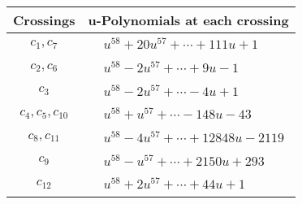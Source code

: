 \documentclass[1p]{elsarticle_modified}
\theoremstyle{definition}
\begin{document}
\begin{tabular}{m{50pt}|m{274pt}}
Crossings & \hspace{64pt}u-Polynomials at each crossing \\
\hline $$\begin{aligned}c_{1},c_{7}\end{aligned}$$&$\begin{aligned}
&u^{58}+20 u^{57}+\cdots+111 u+1
\end{aligned}$\\
\hline $$\begin{aligned}c_{2},c_{6}\end{aligned}$$&$\begin{aligned}
&u^{58}-2 u^{57}+\cdots+9 u-1
\end{aligned}$\\
\hline $$\begin{aligned}c_{3}\end{aligned}$$&$\begin{aligned}
&u^{58}-2 u^{57}+\cdots-4 u+1
\end{aligned}$\\
\hline $$\begin{aligned}c_{4},c_{5},c_{10}\end{aligned}$$&$\begin{aligned}
&u^{58}+u^{57}+\cdots-148 u-43
\end{aligned}$\\
\hline $$\begin{aligned}c_{8},c_{11}\end{aligned}$$&$\begin{aligned}
&u^{58}-4 u^{57}+\cdots+12848 u-2119
\end{aligned}$\\
\hline $$\begin{aligned}c_{9}\end{aligned}$$&$\begin{aligned}
&u^{58}- u^{57}+\cdots+2150 u+293
\end{aligned}$\\
\hline $$\begin{aligned}c_{12}\end{aligned}$$&$\begin{aligned}
&u^{58}+2 u^{57}+\cdots+44 u+1
\end{aligned}$\\
\hline
\end{tabular}\\~\\
\newpage\renewcommand{\arraystretch}{1}
\end{document}
